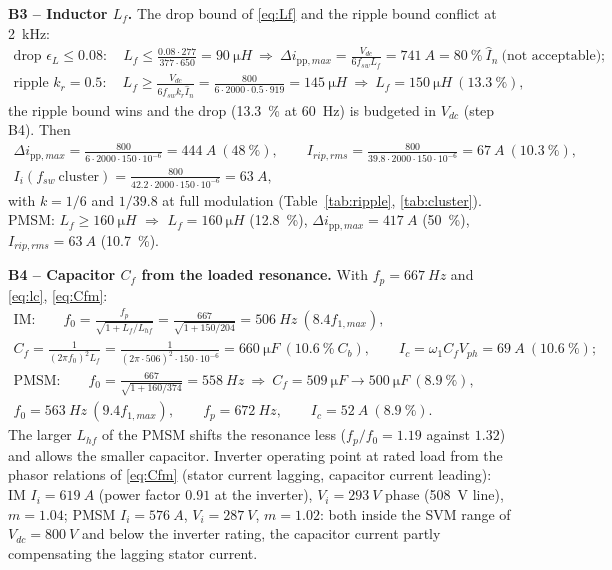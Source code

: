 \documentclass[10pt,a4paper]{scrartcl}
\newcommand{\Vdc}{V_{dc}}
\newcommand{\fsw}{f_{sw}}
\newcommand{\Lhf}{L_{hf}}
\newcommand{\Cf}{C_{f}}
\newcommand{\Lf}{L_{f}}
\newcommand{\pp}{\mathrm{pp}}
\begin{document}
\begin{onehalfspace}
\textbf{B3 -- Inductor $\Lf$.} The drop bound of \eqref{eq:Lf} and the ripple bound conflict at \SI{2}{kHz}:
\begin{gather*}
\text{drop } \epsilon_L \le 0.08:\quad \Lf \le \frac{0.08 \cdot 277}{377 \cdot 650} = \SI{90}{\micro H}\ \Rightarrow\ \Delta i_{\pp,max} = \frac{\Vdc}{6\fsw\Lf} = \SI{741}{A} = \SI{80}{\percent}\ \hat I_n\ \text{(not acceptable)};\\
\text{ripple } k_r = 0.5:\quad \Lf \ge \frac{\Vdc}{6\fsw k_r \hat I_n} = \frac{800}{6 \cdot 2000 \cdot 0.5 \cdot 919} = \SI{145}{\micro H}\ \Rightarrow\ \Lf = \SI{150}{\micro H}\ (\SI{13.3}{\percent}),
\end{gather*}
the ripple bound wins and the drop (\SI{13.3}{\percent} at \SI{60}{Hz}) is budgeted in $\Vdc$ (step B4). Then
\begin{gather*}
\Delta i_{\pp,max} = \frac{800}{6 \cdot 2000 \cdot 150\cdot 10^{-6}} = \SI{444}{A}\ (\SI{48}{\percent}),\qquad
I_{rip,rms} = \frac{800}{39.8 \cdot 2000 \cdot 150 \cdot 10^{-6}} = \SI{67}{A}\ (\SI{10.3}{\percent}),\\
I_i(\fsw\ \text{cluster}) = \frac{800}{42.2 \cdot 2000 \cdot 150 \cdot 10^{-6}} = \SI{63}{A},
\end{gather*}
with $k = 1/6$ and $1/39.8$ at full modulation (Table~\ref{tab:ripple}, \ref{tab:cluster}). PMSM: $\Lf \ge \SI{160}{\micro H}$ $\Rightarrow$ $\Lf = \SI{160}{\micro H}$ (\SI{12.8}{\percent}), $\Delta i_{\pp,max} = \SI{417}{A}$ (\SI{50}{\percent}), $I_{rip,rms} = \SI{63}{A}$ (\SI{10.7}{\percent}).

\textbf{B4 -- Capacitor $\Cf$ from the loaded resonance.} With $f_p = \SI{667}{Hz}$ and \eqref{eq:lc}, \eqref{eq:Cfm}:
\begin{gather*}
\text{IM:}\qquad f_0 = \frac{f_p}{\sqrt{1 + \Lf/\Lhf}} = \frac{667}{\sqrt{1 + 150/204}} = \SI{506}{Hz}\ (8.4 f_{1,max}),\\
\Cf = \frac{1}{(2\pi f_0)^2 \Lf} = \frac{1}{(2\pi \cdot 506)^2 \cdot 150\cdot 10^{-6}} = \SI{660}{\micro F}\ (\SI{10.6}{\percent}\ C_b),\qquad I_c = \omega_1 \Cf V_{ph} = \SI{69}{A}\ (\SI{10.6}{\percent});\\
\text{PMSM:}\qquad f_0 = \frac{667}{\sqrt{1 + 160/374}} = \SI{558}{Hz}\ \Rightarrow\ \Cf = \SI{509}{\micro F} \to \SI{500}{\micro F}\ (\SI{8.9}{\percent}),\\
f_0 = \SI{563}{Hz}\ (9.4 f_{1,max}),\qquad f_p = \SI{672}{Hz},\qquad I_c = \SI{52}{A}\ (\SI{8.9}{\percent}).
\end{gather*}
The larger $\Lhf$ of the PMSM shifts the resonance less ($f_p/f_0 = 1.19$ against $1.32$) and allows the smaller capacitor. Inverter operating point at rated load from the phasor relations of \eqref{eq:Cfm} (stator current lagging, capacitor current leading): IM $I_i = \SI{619}{A}$ (power factor $0.91$ at the inverter), $V_i = \SI{293}{V}$ phase (\SI{508}{V} line), $m = 1.04$; PMSM $I_i = \SI{576}{A}$, $V_i = \SI{287}{V}$, $m = 1.02$: both inside the SVM range of $\Vdc = \SI{800}{V}$ and below the inverter rating, the capacitor current partly compensating the lagging stator current.


\end{onehalfspace}
\end{document}
